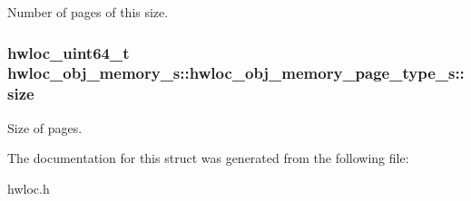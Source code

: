 Number of pages of this size. 

\hypertarget{a00019_a3f1d261766352288791512974665ce01}{
\subsubsection[{size}]{\setlength{\rightskip}{0pt plus 5cm}hwloc\_\-uint64\_\-t {\bf hwloc\_\-obj\_\-memory\_\-s::hwloc\_\-obj\_\-memory\_\-page\_\-type\_\-s::size}}}
\label{a00019_a3f1d261766352288791512974665ce01}


Size of pages. 



The documentation for this struct was generated from the following file:\begin{DoxyCompactItemize}
\item 
hwloc.h\end{DoxyCompactItemize}
